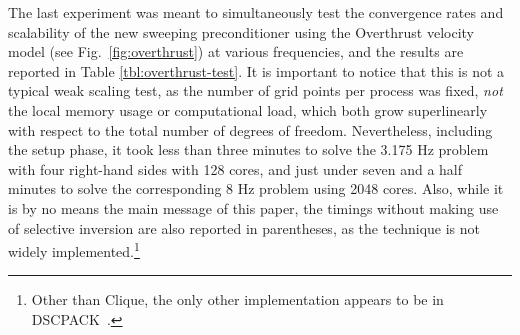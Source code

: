 The last experiment was meant to simultaneously test the convergence rates and 
scalability of the new sweeping preconditioner using the Overthrust velocity 
model (see Fig.~\ref{fig:overthrust}) at various frequencies, and the results
are reported in Table \ref{tbl:overthrust-test}.
It is important to notice that this is not a typical weak scaling test, as
the number of grid points per process was fixed, {\em not} the local memory 
usage or computational load, which both grow superlinearly with respect to the
total number of degrees of freedom. Nevertheless, including the setup phase, 
it took less than three minutes to solve the 3.175 Hz problem with 
four right-hand sides with 128 cores, and just under seven and a half minutes
to solve the corresponding 8 Hz problem using 2048 cores.
Also, while it is by no means the main 
message of this paper, the timings without making use of selective inversion 
are also reported in parentheses, as the technique is not widely 
implemented.\footnote{Other than Clique, the only other implementation appears 
to be in DSCPACK~\cite{Raghavan-dscpack}.}




